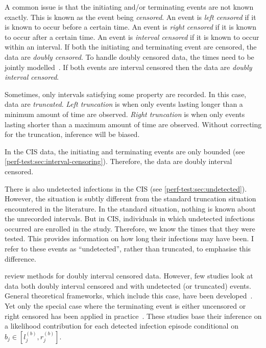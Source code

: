 \documentclass[thesis.tex]{subfiles}
\begin{document}
A common issue is that the initiating and/or terminating events are not known exactly.
This is known as the event being \emph{censored}.
An event is \emph{left censored} if it is known to occur before a certain time.
An event is \emph{right censored} if it is known to occur after a certain time.
An event is \emph{interval censored} if it is known to occur within an interval.
If both the initiating and terminating event are censored, the data are \emph{doubly censored}.
To handle doubly censored data, the times need to be jointly modelled~\autocite[and references therein]{liSemiparametric}.
If both events are interval censored then the data are \emph{doubly interval censored}.

Sometimes, only intervals satisfying some property are recorded.
In this case, data are \emph{truncated}.
\emph{Left truncation} is when only events lasting longer than a minimum amount of time are observed.
\emph{Right truncation} is when only events lasting shorter than a maximum amount of time are observed.
Without correcting for the truncation, inference will be biased.

In the CIS data, the initiating and terminating events are only bounded (see \cref{perf-test:sec:interval-censoring}).
Therefore, the data are doubly interval censored.

There is also undetected infections in the CIS (see \cref{perf-test:sec:undetected}).
However, the situation is subtly different from the standard truncation situation encountered in the literature.
In the standard situation, nothing is known about the unrecorded intervals.
But in CIS, individuals in which undetected infections occurred are enrolled in the study.
Therefore, we know the times that they were tested.
This provides information on how long their infections may have been.
I refer to these events as ``undetected'', rather than truncated, to emphasise this difference.

\Textcite{sunAnalysis,bogaertsSurvival} review methods for doubly interval censored data.
However, few studies look at data both doubly interval censored and with undetected (or truncated) events.
General theoretical frameworks, which include this case, have been developed~\autocite{turnbullEmpirical,dempsterMaximum}.
Yet only the special case where the terminating event is either uncensored or right censored has been applied in practice~\autocite[e.g.][]{sunEmpirical,bacchettiNonparametric,shenNonparametric}.
These studies base their inference on a likelihood contribution for each detected infection episode conditional on $b_j \in [l_j^{(b)}, r_j^{(b)}]$.
\end{document}
